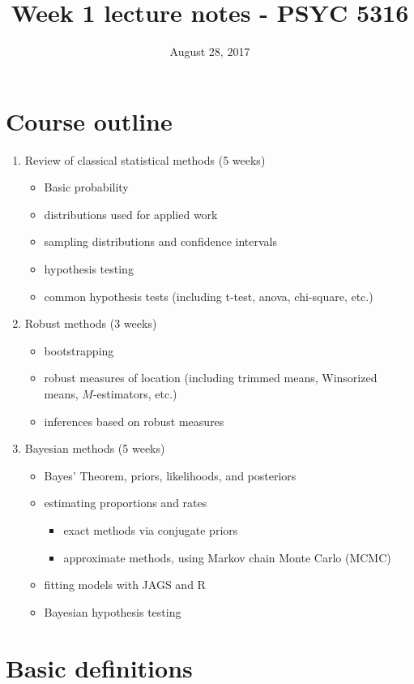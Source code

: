 \documentclass[11pt]{article}
\date{August 28, 2017}
\title{Week 1 lecture notes - PSYC 5316}
\begin{document}
\maketitle

\section*{Course outline}
\label{sec-1}

\begin{enumerate}
\item Review of classical statistical methods (5 weeks)
\begin{itemize}
\item Basic probability
\item distributions used for applied work
\item sampling distributions and confidence intervals
\item hypothesis testing
\item common hypothesis tests (including t-test, anova, chi-square, etc.)
\end{itemize}
\item Robust methods (3 weeks)
\begin{itemize}
\item bootstrapping
\item robust measures of location (including trimmed means, Winsorized means, $M$-estimators, etc.)
\item inferences based on robust measures
\end{itemize}
\item Bayesian methods (5 weeks)
\begin{itemize}
\item Bayes' Theorem, priors, likelihoods, and posteriors
\item estimating proportions and rates 
\begin{itemize}
\item exact methods via conjugate priors
\item approximate methods, using Markov chain Monte Carlo (MCMC)
\end{itemize}
\item fitting models with JAGS and R
\item Bayesian hypothesis testing
\end{itemize}
\end{enumerate}


\section*{Basic definitions}
\label{sec-2}
\end{document}
